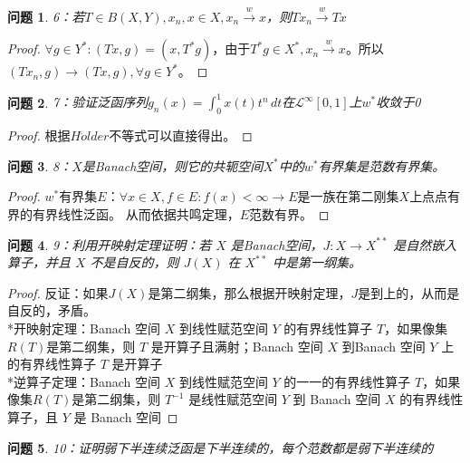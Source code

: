 \documentclass[a4paper, 12pt]{ctexart}
\newtheorem*{theorem}{问题}%
\begin{document}
\begin{theorem}
6：若$T \in B(X,Y),x_n,x \in X,x_n \overset{w}{\to} x$，则$Tx_n\overset{w}{\to} Tx$
\end{theorem}

\begin{proof}
$\forall g \in Y^*:(Tx,g)=(x,T^*g)$，由于$T^*g \in X^*,x_n \overset{w}{\rightarrow}x$。所以$(Tx_n,g) \to (Tx,g),\forall g \in Y^*$。
\end{proof}

\begin{theorem}
7：验证泛函序列$g_n(x)=\int_0^1 x(t)t^n \, dt$在$\mathscr{L}^\infty[0,1]$上$w^*$收敛于0
\end{theorem}

\begin{proof}
根据$H\ddot{o}lder$不等式可以直接得出。
\end{proof}

\begin{theorem}
8：$X$是Banach空间，则它的共轭空间$X^*$中的$w^*$有界集是范数有界集。
\end{theorem}

\begin{proof}
$w^*$有界集$E$：$\forall x \in X ,f \in E:f(x)<\infty\to E$是一族在第二刚集$X$上点点有界的有界线性泛函。
从而依据共鸣定理，$E$范数有界。
\end{proof}

\begin{theorem}
9：利用开映射定理证明：若 $X$ 是Banach空间，$J: X \rightarrow X^{**}$ 是自然嵌入算子，并且 $X$ 不是自反的，则 $J(X)$ 在 $X^{**}$ 中是第一纲集。
\end{theorem}

\begin{proof}
反证：如果$J(X)$是第二纲集，那么根据开映射定理，$J$是到上的，从而是自反的，矛盾。
\\
*开映射定理：Banach 空间 $X$ 到线性赋范空间 $Y$ 的有界线性算子 $T$，如果像集$R(T)$是第二纲集，则 $T$ 是开算子且满射；Banach 空间 $X$ 到Banach 空间 $Y$ 上的有界线性算子 $T$ 是开算子
\\
*逆算子定理：Banach 空间 $X$ 到线性赋范空间 $Y$ 的一一的有界线性算子 $T$，如果像集$R(T)$是第二纲集，则 $T^{-1}$ 是线性赋范空间 $Y$ 到 Banach 空间 $X$ 的有界线性算子，且 $Y$ 是 Banach 空间
\end{proof}

\begin{theorem}
10：证明弱下半连续泛函是下半连续的，每个范数都是弱下半连续的
\end{theorem}
\end{document}
